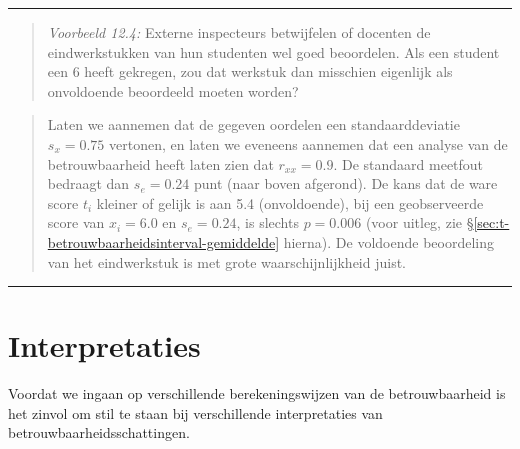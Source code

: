 \documentclass[
]{book}
\begin{document}
\begin{center}\rule{0.5\linewidth}{0.5pt}\end{center}

\begin{quote}
\emph{Voorbeeld 12.4:}
Externe inspecteurs betwijfelen of docenten de eindwerkstukken van hun
studenten wel goed beoordelen. Als een student een 6 heeft gekregen, zou
dat werkstuk dan misschien eigenlijk als onvoldoende beoordeeld moeten
worden?
\end{quote}

\begin{quote}
Laten we aannemen dat de gegeven oordelen een standaarddeviatie
\(s_x=0.75\) vertonen, en laten we eveneens aannemen dat een analyse van
de betrouwbaarheid heeft laten zien dat \(r_{xx}=0.9\). De standaard
meetfout bedraagt dan \(s_e = 0.24\) punt (naar boven afgerond). De kans
dat de ware score \(t_i\) kleiner of gelijk is aan 5.4 (onvoldoende), bij
een geobserveerde score van \(x_i=6.0\) en \(s_e=0.24\), is slechts \(p=0.006\)
(voor uitleg, zie §\ref{sec:t-betrouwbaarheidsinterval-gemiddelde} hierna).
De voldoende beoordeling van het eindwerkstuk is met grote
waarschijnlijkheid juist.
\end{quote}

\begin{center}\rule{0.5\linewidth}{0.5pt}\end{center}

\hypertarget{interpretaties}{%
\section{Interpretaties}\label{interpretaties}}

Voordat we ingaan op verschillende berekeningswijzen van de
betrouwbaarheid is het zinvol om stil te staan bij verschillende
interpretaties van betrouwbaarheidsschattingen.
\end{document}
